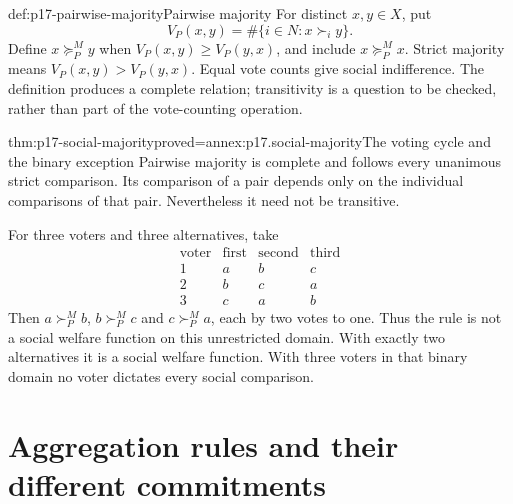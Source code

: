 \begin{hbdefinition}{def:p17-pairwise-majority}{Pairwise majority}
For distinct \(x,y\in X\), put
\[
 V_P(x,y)=\#\{i\in N:x\succ_i y\}.
\]
Define \(x\succeq^M_Py\) when \(V_P(x,y)\geq V_P(y,x)\), and
include \(x\succeq^M_Px\). Strict majority means
\(V_P(x,y)>V_P(y,x)\). Equal vote counts give social indifference.
The definition produces a complete relation; transitivity is a question
to be checked, rather than part of the vote-counting operation.
\end{hbdefinition}

\begin{hbtheorem}{thm:p17-social-majority}{proved=annex:p17.social-majority}{The voting cycle and the binary exception}
Pairwise majority is complete and follows every unanimous strict comparison.
Its comparison of a pair depends only on the individual comparisons of
that pair. Nevertheless it need not be transitive.

For three voters and three alternatives, take
\[
 \begin{array}{c|ccc}
 \text{voter}&\text{first}&\text{second}&\text{third}\\ \hline
 1&a&b&c\\
 2&b&c&a\\
 3&c&a&b
 \end{array}
\]
Then \(a\succ^M_Pb\), \(b\succ^M_Pc\) and \(c\succ^M_Pa\), each by
two votes to one. Thus the rule is not a social welfare function on this
unrestricted domain. With exactly two alternatives it is a social welfare
function. With three voters in that binary domain no voter dictates every
social comparison.
\end{hbtheorem}

\section{Aggregation rules and their different commitments}
\label{sec:p17-social-rules}

